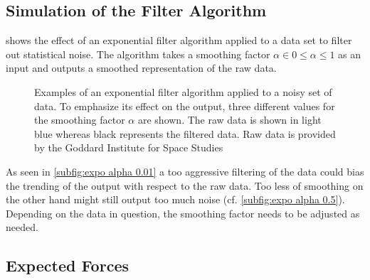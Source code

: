        \subsection{Simulation of the Filter Algorithm}\label{sec:A9 simu of the filter algo}%
             shows the effect of an exponential filter algorithm applied to a data set to filter
            out statistical noise. The algorithm takes a smoothing factor \(\alpha \in 0 \leq \alpha \leq 1\) as an input and outputs
            a smoothed representation of the raw data.\par 
            \begin{figure}[H]
                \centering
                \subfloat[Expo-smoothing at \(\alpha = 0.01\).\label{subfig:expo alpha 0.01}]{}
            \end{figure}
            \begin{figure}[H]\ContinuedFloat
                \centering
                \subfloat[Expo-smoothing at \(\alpha = 0.05\).\label{subfig:expo alpha 0.05}]{}
            \end{figure}
            \begin{figure}[H]\ContinuedFloat
                \centering
                \subfloat[Expo-smoothing at \(\alpha = 0.5\).\label{subfig:expo alpha 0.5}]{}
                \caption[Examples of an exponential filter algorithm applied to a noisy set of data]{Examples of an exponential
                filter algorithm applied to a noisy set of data. To emphasize its effect on the output, three different values for the smoothing factor \(\alpha\) are shown.
                The raw data is shown in light blue whereas black represents the filtered data. Raw data is provided by the Goddard Institute for Space Studies \cite{GISS.nasa.surface.temperature.analysis.20210120}}
                \label{fig:all expo filtered samples}
            \end{figure}
            As seen in \cref{subfig:expo alpha 0.01} a too aggressive filtering of the data could bias the trending of the output
            with respect to the raw data. Too less of smoothing on the other hand might still output too much noise (cf. \cref{subfig:expo alpha 0.5}).
            Depending on the data in question, the smoothing factor needs to be adjusted as needed.
        \subsection{Expected Forces}\label{sec:A10 expected forces}%
